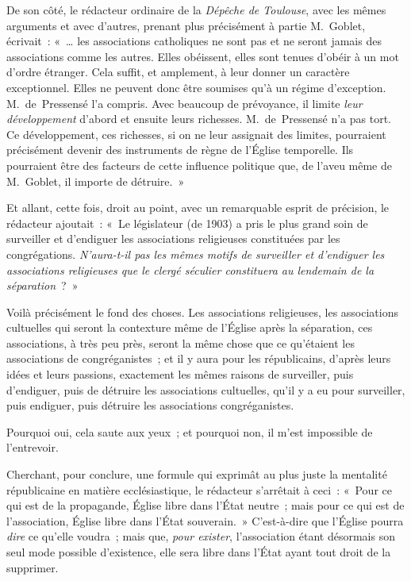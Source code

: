 \documentclass[french,twoside]{book} %
\begin{document}
De son côté, le rédacteur ordinaire de la \emph{Dépêche de Toulouse}, avec les mêmes arguments et avec d’autres, prenant plus précisément à partie M. Goblet, écrivait : « … les associations catholiques ne sont pas et ne seront jamais des associations comme les autres. Elles obéissent, elles sont tenues d’obéir à un mot d’ordre étranger. Cela suffit, et amplement, à leur donner un caractère exceptionnel. Elles ne peuvent donc être soumises qu’à un régime d’exception. M. de Pressensé l’a compris. Avec beaucoup de prévoyance, il limite {\itshape leur développement} d’abord et ensuite leurs richesses. M. de Pressensé n’a pas tort. Ce développement, ces richesses, si on ne leur assignait des limites,  pourraient précisément devenir des instruments de règne de l’Église temporelle. Ils pourraient être des facteurs de cette influence politique que, de l’aveu même de M. Goblet, il importe de détruire. »\par
Et allant, cette fois, droit au point, avec un remarquable esprit de précision, le rédacteur ajoutait : « Le législateur (de 1903) a pris le plus grand soin de surveiller et d’endiguer les associations religieuses constituées par les congrégations. {\itshape N’aura-t-il pas les mêmes motifs de surveiller et d’endiguer les associations religieuses que le clergé séculier constituera au lendemain de la séparation} ? »\par
Voilà précisément le fond des choses. Les associations religieuses, les associations cultuelles qui seront la contexture même de l’Église après la séparation, ces associations, à très peu près, seront la même chose que ce qu’étaient les associations de congréganistes ; et il y aura pour les républicains, d’après leurs idées et leurs passions, exactement les mêmes raisons de surveiller, puis d’endiguer, puis de détruire les associations cultuelles, qu’il y a eu pour surveiller, puis endiguer, puis détruire les associations congréganistes.\par
Pourquoi oui, cela saute aux yeux ; et pourquoi non, il m’est impossible de l’entrevoir.\par
 Cherchant, pour conclure, une formule qui exprimât au plus juste la mentalité républicaine en matière ecclésiastique, le rédacteur s’arrêtait à ceci : « Pour ce qui est de la propagande, Église libre dans l’État neutre ; mais pour ce qui est de l’association, Église libre dans l’État souverain. » C’est-à-dire que l’Église pourra {\itshape dire} ce qu’elle voudra ; mais que, {\itshape pour exister}, l’association étant désormais son seul mode possible d’existence, elle sera libre dans l’État ayant tout droit de la supprimer.\par
\end{document}
